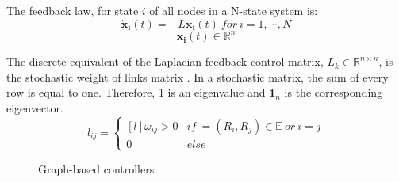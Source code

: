 \documentclass[a4paper, 12pt]{report}
\begin{document}
The feedback law, for state $i$ of all nodes in a N-state system is:
\[ \boldsymbol{\dot x_i}(t) = - L\boldsymbol{x_i}(t)\ for\ i=1, \cdots, N \]
\[\boldsymbol{x_i}(t) \in \mathbb{R}^n\]

The discrete equivalent of the Laplacian feedback control matrix, $L_k \in \mathbb{R}^{n \times n}$, is the stochastic weight of links matrix \cite{Moreau2005}. In a stochastic matrix, the sum of every row is equal to one. Therefore, 1 is an eigenvalue and $\boldsymbol{1}_n$ is the corresponding eigenvector.
\[l_{ij} =  \left\{ \begin{matrix*}[l] \omega_{ij} > 0 & if\  = (R_i, R_j) \in \mathbb{E}\ or\ i=j\\ 0 & else \end{matrix*} \right.\]

\begin{figure}[htbp]
\centering
{}
\caption{Graph-based controllers}
\label{fig:laplacianCont}
\end{figure}
\end{document}
